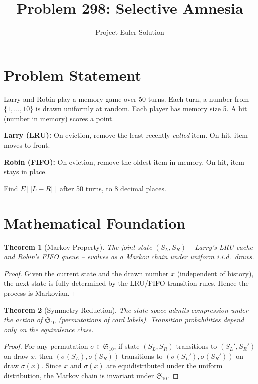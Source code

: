 \documentclass[12pt]{article}
\title{Problem 298: Selective Amnesia}
\author{Project Euler Solution}
\date{}
\newtheorem{theorem}{Theorem}
\begin{document}
\maketitle

\section{Problem Statement}
Larry and Robin play a memory game over 50 turns. Each turn, a number from $\{1,\ldots,10\}$ is drawn uniformly at random. Each player has memory size 5. A hit (number in memory) scores a point.

\textbf{Larry (LRU):} On eviction, remove the least recently \emph{called} item. On hit, item moves to front.

\textbf{Robin (FIFO):} On eviction, remove the oldest item in memory. On hit, item stays in place.

Find $E[|L - R|]$ after 50 turns, to 8 decimal places.

\section{Mathematical Foundation}

\begin{theorem}[Markov Property]
The joint state $(S_L, S_R)$ -- Larry's LRU cache and Robin's FIFO queue -- evolves as a Markov chain under uniform i.i.d.\ draws.
\end{theorem}

\begin{proof}
Given the current state and the drawn number $x$ (independent of history), the next state is fully determined by the LRU/FIFO transition rules. Hence the process is Markovian.
\end{proof}

\begin{theorem}[Symmetry Reduction]
The state space admits compression under the action of $\mathfrak{S}_{10}$ (permutations of card labels). Transition probabilities depend only on the equivalence class.
\end{theorem}

\begin{proof}
For any permutation $\sigma \in \mathfrak{S}_{10}$, if state $(S_L, S_R)$ transitions to $(S_L', S_R')$ on draw $x$, then $(\sigma(S_L), \sigma(S_R))$ transitions to $(\sigma(S_L'), \sigma(S_R'))$ on draw $\sigma(x)$. Since $x$ and $\sigma(x)$ are equidistributed under the uniform distribution, the Markov chain is invariant under $\mathfrak{S}_{10}$.
\end{proof}
\end{document}
